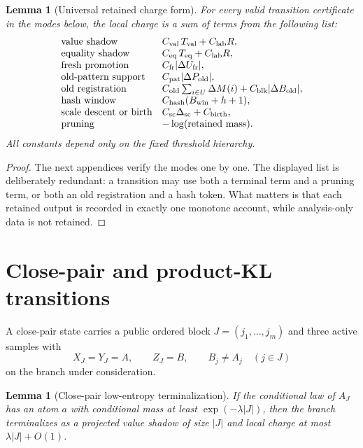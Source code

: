 \documentclass[11pt]{article}
\newtheorem{lemma}[theorem]{Lemma}
\theoremstyle{remark}
\newcommand{\old}{\mathrm{old}}
\newcommand{\fr}{\mathrm{fr}}
\newcommand{\scal}{\mathrm{sc}}
\begin{document}
\begin{lemma}[Universal retained charge form]\label{lem:universal-charge}
For every valid transition certificate in the modes below, the local charge is a sum of terms from the following list:
\[
\begin{array}{ll}
\hbox{value shadow} & C_{\rm val}\,T_{\rm val}+C_{\rm lab}R,\\
\hbox{equality shadow} & C_{\rm eq}\,T_{\rm eq}+C_{\rm lab}R,\\
\hbox{fresh promotion} & C_{\fr}|\Delta U_{\fr}|,\\
\hbox{old-pattern support} & C_{\rm pat}|\Delta P_{\old}|,\\
\hbox{old registration} & C_{\old}\sum_{i\in U}\Delta M(i)+C_{\rm blk}|\Delta B_{\old}|,\\
\hbox{hash window} & C_{\rm hash}(B_{\rm win}+h+1),\\
\hbox{scale descent or birth} & C_{\scal}\Delta_{\scal}+C_{\rm birth},\\
\hbox{pruning} & -\log(\hbox{retained mass}).
\end{array}
\]
All constants depend only on the fixed threshold hierarchy.
\end{lemma}

\begin{proof}
The next appendices verify the modes one by one.  The displayed list is deliberately redundant: a transition may use both a terminal term and a pruning term, or both an old registration and a hash token.  What matters is that each retained output is recorded in exactly one monotone account, while analysis-only data is not retained.
\end{proof}

\section{Close-pair and product-KL transitions}\label{app:close-product}

A close-pair state carries a public ordered block $J=(j_1,\ldots,j_m)$ and three active samples with
\[
        X_J=Y_J=A,
        \qquad Z_J=B,
        \qquad B_j\ne A_j\quad (j\in J)
\]
on the branch under consideration.

\begin{lemma}[Close-pair low-entropy terminalization]\label{lem:app-low-entropy}
If the conditional law of $A_J$ has an atom $a$ with conditional mass at least $\exp(-\lambda |J|)$, then the branch terminalizes as a projected value shadow of size $|J|$ and local charge at most $\lambda |J|+O(1)$.
\end{lemma}
\end{document}
